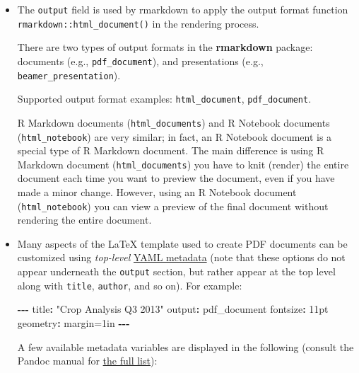 \documentclass[
]{book}
\newenvironment{Shaded}{\begin{snugshade}}{\end{snugshade}}
\newcommand{\DataTypeTok}[1]{\textcolor[rgb]{0.13,0.29,0.53}{#1}}
\newcommand{\DecValTok}[1]{\textcolor[rgb]{0.00,0.00,0.81}{#1}}
\newcommand{\NormalTok}[1]{#1}
\newcommand{\OtherTok}[1]{\textcolor[rgb]{0.56,0.35,0.01}{#1}}
\newcommand{\SpecialCharTok}[1]{\textcolor[rgb]{0.81,0.36,0.00}{\textbf{#1}}}
\newcommand{\StringTok}[1]{\textcolor[rgb]{0.31,0.60,0.02}{#1}}
\begin{document}
\begin{itemize}
\item
  The \texttt{output} field is used by rmarkdown to apply the output format function \texttt{rmarkdown::html\_document()} in the rendering process.

  There are two types of output formats in the \textbf{rmarkdown} package: documents (e.g., \texttt{pdf\_document}), and presentations (e.g., \texttt{beamer\_presentation}).

  Supported output format examples: \texttt{html\_document}, \texttt{pdf\_document}.

  R Markdown documents (\texttt{html\_documents}) and R Notebook documents (\texttt{html\_notebook}) are very similar; in fact, an R Notebook document is a special type of R Markdown document. The main difference is using R Markdown document (\texttt{html\_documents}) you have to knit (render) the entire document each time you want to preview the document, even if you have made a minor change. However, using an R Notebook document (\texttt{html\_notebook}) you can view a preview of the final document without rendering the entire document.
\item
  Many aspects of the LaTeX template used to create PDF documents can be customized using \emph{top-level} \href{https://bookdown.org/yihui/rmarkdown/pdf-document.html\#tab:latex-vars}{YAML metadata} (note that these options do not appear underneath the \texttt{output} section, but rather appear at the top level along with \texttt{title}, \texttt{author}, and so on). For example:

\begin{Shaded}
\begin{Highlighting}[]
\SpecialCharTok{{-}{-}{-}}
\NormalTok{title}\SpecialCharTok{:} \StringTok{"Crop Analysis Q3 2013"}
\NormalTok{output}\SpecialCharTok{:}\NormalTok{ pdf\_document}
\NormalTok{fontsize}\SpecialCharTok{:} \DecValTok{11}\NormalTok{pt}
\NormalTok{geometry}\SpecialCharTok{:}\NormalTok{ margin}\OtherTok{=}\DecValTok{1}\DataTypeTok{i}\NormalTok{n}
\SpecialCharTok{{-}{-}{-}}
\end{Highlighting}
\end{Shaded}

  A few available metadata variables are displayed in the following (consult the Pandoc manual for \href{https://pandoc.org/MANUAL.html\#variables-for-latex}{the full list}):


\end{itemize}
\end{document}
